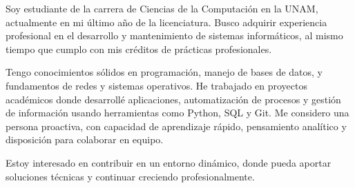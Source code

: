 
\cvparagraph{}

Soy estudiante de la carrera de Ciencias de la Computación en la UNAM, actualmente en mi último año de la licenciatura. Busco adquirir experiencia profesional en el desarrollo y mantenimiento de sistemas informáticos, al mismo tiempo que cumplo con mis créditos de prácticas profesionales.

Tengo conocimientos sólidos en programación, manejo de bases de datos, y fundamentos de redes y sistemas operativos. He trabajado en proyectos académicos donde desarrollé aplicaciones, automatización de procesos y gestión de información usando herramientas como Python, SQL y Git. Me considero una persona proactiva, con capacidad de aprendizaje rápido, pensamiento analítico y disposición para colaborar en equipo.

Estoy interesado en contribuir en un entorno dinámico, donde pueda aportar soluciones técnicas y continuar creciendo profesionalmente.
